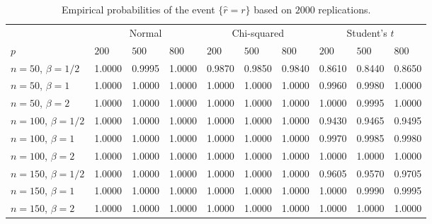 \documentclass[times,sort&compress,3p]{elsarticle}
\theoremstyle{plain}
\theoremstyle{definition}
\theoremstyle{remark}
\begin{document}
\begin{table}[ht]
    \caption{Empirical probabilities of the event $\{\hat{r}=r\}$ based on $2000$ replications.} 
\label{newnewtable}
\vspace{3mm}
\centering
\begin{tabular}{llllllllll}
\toprule
    &   \multicolumn{3}{c}{Normal} & \multicolumn{3}{c}{Chi-squared}& \multicolumn{3}{c}{Student's $t$}  \\
    \cmidrule(r){2-4}
\cmidrule(r){5-7}
\cmidrule(r){8-10}
    $p$ & $200$ &  $500$ & $800$ & $200$  & $500$ & $800$ & $200$ & $500$ & $800$ \\ 
\midrule
    $n=50$, $\beta=1/2$ & 1.0000 & 0.9995& 1.0000 &0.9870&0.9850&0.9840&0.8610&0.8440&0.8650\\
    $n=50$, $\beta=1$ & 1.0000 & 1.0000 & 1.0000 & 1.0000 & 1.0000 & 1.0000 & 0.9960 & 0.9980 & 1.0000\\
    $n=50$, $\beta=2$ & 1.0000 & 1.0000 & 1.0000 & 1.0000 & 1.0000 & 1.0000 & 1.0000 & 0.9995 & 1.0000\\
    \midrule
    $n=100$, $\beta=1/2$ & 1.0000 & 1.0000 & 1.0000 & 1.0000 & 1.0000 & 1.0000 & 0.9430 & 0.9465 & 0.9495 \\
    $n=100$, $\beta=1$ & 1.0000 & 1.0000 & 1.0000 & 1.0000 & 1.0000 & 1.0000 & 0.9970 & 0.9985 & 0.9980\\
    $n=100$, $\beta=2$ & 1.0000 & 1.0000 & 1.0000 & 1.0000 & 1.0000 & 1.0000  & 1.0000 & 1.0000 & 1.0000\\
    \midrule
    $n=150$, $\beta=1/2$ & 1.0000 & 1.0000 & 1.0000 & 1.0000 & 1.0000 & 1.0000 & 0.9605 & 0.9570 & 0.9705 \\
    $n=150$, $\beta=1$ & 1.0000 & 1.0000 & 1.0000 & 1.0000 & 1.0000 & 1.0000 & 1.0000 & 0.9990 & 0.9995 \\
    $n=150$, $\beta=2$ & 1.0000 & 1.0000 & 1.0000 & 1.0000 & 1.0000 & 1.0000 & 1.0000 & 1.0000 & 1.0000 \\
\bottomrule
\end{tabular}
\end{table}




\end{document}
